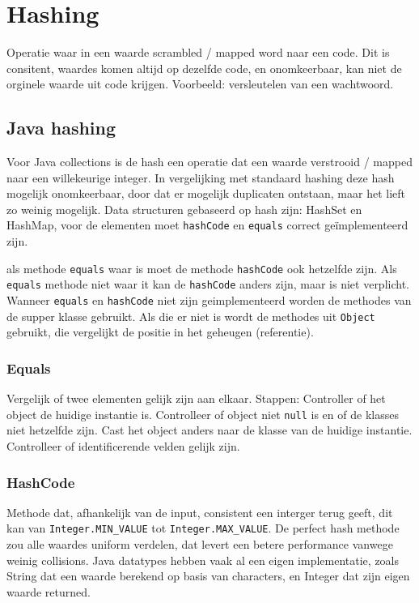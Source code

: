 \section{Hashing}
Operatie waar in een waarde scrambled / mapped word naar een code.
Dit is consitent, waardes komen altijd op dezelfde code, en onomkeerbaar, kan niet de orginele waarde uit code krijgen.
Voorbeeld: versleutelen van een wachtwoord.

\subsection{Java hashing}
Voor Java collections is de hash een operatie dat een waarde verstrooid / mapped naar een willekeurige integer.
In vergelijking met standaard hashing deze hash mogelijk onomkeerbaar, door dat er mogelijk duplicaten ontstaan, maar het lieft zo weinig mogelijk.
Data structuren gebaseerd op hash zijn: HashSet en HashMap, voor de elementen moet \texttt{hashCode} en \texttt{equals} correct geïmplementeerd zijn.

als methode \texttt{equals} waar is moet de methode \texttt{hashCode} ook hetzelfde zijn.
Als \texttt{equals} methode niet waar it kan de \texttt{hashCode} anders zijn, maar is niet verplicht.
Wanneer \texttt{equals} en \texttt{hashCode} niet zijn geimplementeerd worden de methodes van de supper klasse gebruikt.
Als die er niet is wordt de methodes uit \texttt{Object} gebruikt, die vergelijkt de positie in het geheugen (referentie).

\subsubsection{Equals}
Vergelijk of twee elementen gelijk zijn aan elkaar.
Stappen:
Controller of het object de huidige instantie is.
Controlleer of object niet \texttt{null} is en of de klasses niet hetzelfde zijn.
Cast het object anders naar de klasse van de huidige instantie.
Controlleer of identificerende velden gelijk zijn.

\subsubsection{HashCode}
Methode dat, afhankelijk van de input, consistent een interger terug geeft, dit kan van \texttt{Integer.MIN\_VALUE} tot \texttt{Integer.MAX\_VALUE}.
De perfect hash methode zou alle waardes uniform verdelen, dat levert een betere performance vanwege weinig collisions.
Java datatypes hebben vaak al een eigen implementatie, zoals String dat een waarde berekend op basis van characters, en Integer dat zijn eigen waarde returned.

